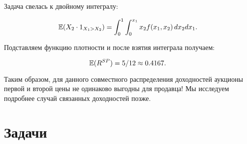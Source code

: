 \begin{enumerate}
Задача свелась к двойному интегралу:

\begin{equation}
\operatorname{\mathbb{E}}(X_{2}\cdot 1_{X_{1}>X_{2}})=\int_{0}^{1} \int_{0}^{x_{1}}  x_{2}  f(x_{1},x_{2}) \, dx_{2} dx_{1}.
\end{equation}

Подставляем функцию плотности и после взятия интеграла получаем:

\begin{equation}
\operatorname{\mathbb{E}}(R^{SP})=5/12\approx 0.4167.
\end{equation}

\end{enumerate}

Таким образом, для данного совместного распределения доходностей аукционы первой и второй цены не одинаково выгодны для продавца! Мы исследуем подробнее случай связанных доходностей позже.



\section{Задачи}


